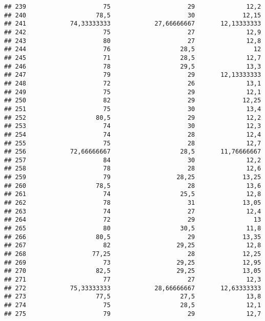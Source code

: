 \documentclass[
]{article}
\begin{document}
\begin{verbatim}
## 239                     75                     29              12,2
## 240                   78,5                     30             12,15
## 241            74,33333333            27,66666667       12,13333333
## 242                     75                     27              12,9
## 243                     80                     27              12,8
## 244                     76                   28,5                12
## 245                     71                   28,5              12,7
## 246                     78                   29,5              13,3
## 247                     79                     29       12,13333333
## 248                     72                     26              13,1
## 249                     75                     29              12,1
## 250                     82                     29             12,25
## 251                     75                     30              13,4
## 252                   80,5                     29              12,2
## 253                     74                     30              12,3
## 254                     74                     28              12,4
## 255                     75                     28              12,7
## 256            72,66666667                   28,5       11,76666667
## 257                     84                     30              12,2
## 258                     78                     28              12,6
## 259                     79                  28,25             13,25
## 260                   78,5                     28              13,6
## 261                     74                   25,5              12,8
## 262                     78                     31             13,05
## 263                     74                     27              12,4
## 264                     72                     29                13
## 265                     80                   30,5              11,8
## 266                   80,5                     29             13,35
## 267                     82                  29,25              12,8
## 268                  77,25                     28             12,25
## 269                     73                  29,25             12,95
## 270                   82,5                  29,25             13,05
## 271                     77                     27              12,3
## 272            75,33333333            28,66666667       12,63333333
## 273                   77,5                   27,5              13,8
## 274                     75                   28,5              12,1
## 275                     79                     29              12,7

\end{verbatim}
\end{document}
